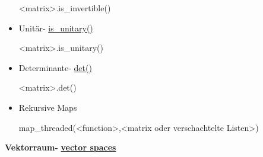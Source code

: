 \documentclass[a4paper,9pt,DIV15,twocolumn]{scrartcl}
\begin{document}
\begin{itemize}
    \begin{sagein}
<matrix>.is_invertible()
    \end{sagein}
	\item Unit\"ar- \href{https://sage.math.uni-goettingen.de/doc/static/reference/matrices/sage/matrix/matrix2.html?highlight=is_unitary}{is\_unitary()}
    \begin{sagein}
<matrix>.is_unitary()
    \end{sagein}
\item Determinante- \href{https://sage.math.uni-goettingen.de/doc/static/reference/sage/matrix/matrix2.html?highlight=matrix.det#sage.matrix.matrix2.Matrix.det}{det()}
\begin{sagein}
<matrix>.det()
\end{sagein}
\item Rekursive Maps
\begin{sagein}
map_threaded(<function>,<matrix oder verschachtelte Listen>)
\end{sagein}
\end{itemize}

\textbf{Vektorraum- } \href{https://sage.math.uni-goettingen.de/doc/static/reference/sage/categories/vector_spaces.html#vector-spaces}{\textbf{vector spaces}}
\end{document}
